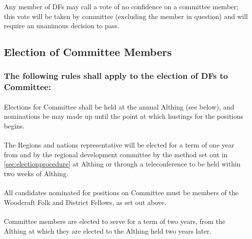 \documentclass[a4paper, 12pt]{article}
\begin{document}
\subsubsection{}
Any member of DFs may call a vote of no confidence on a committee member; this vote will be taken by committee (excluding the member in question) and will require an unanimous decision to pass.

\subsection{Election of Committee Members}
\label{sec:election}
\subsubsection{The following rules shall apply to the election of DFs to Committee:}
\paragraph{}
Elections for Committee shall be held at the annual Althing (see below), and nominations be may made up until the point at which hustings for the positions begins.

\paragraph{}
The Regions and nations representative will be elected for a term of one year from and by the regional development committee by the method set out in \ref{sec:electionprocedure} at Althing or through a teleconference to be held within two weeks of Althing.

\paragraph{}
All candidates nominated for positions on Committee must be members of the Woodcraft Folk and District Fellows, as set out above.

\paragraph{}
Committee members are elected to serve for a term of two years, from the Althing at which they are elected to the Althing held two years later.
\end{document}
